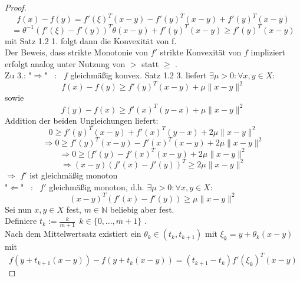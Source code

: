 \begin{proof}
		\begin{equation*}
		f(x)-f(y)=f'(\xi)^T(x-y)-f'(y)^T(x-y)+f'(y)^T(x-y)
		\end{equation*}
		\begin{equation*}
		=\theta^{-1}(f'(\xi)-f'(y))^T\theta(x-y)+f'(y)^T(x-y) \geq f'(y)^T(x-y)
		\end{equation*}
		mit Satz 1.2 1. folgt dann die Konvexität von f. \\
		Der Beweis, dass strikte Monotonie von $f'$ strikte Konvexität von $f$ impliziert erfolgt analog unter Nutzung von \(>\) statt  \( \geq \) . \\
		Zu 3.: 
		"$\Rightarrow$" \ : \ $f$ gleichmäßig konvex. Satz 1.2 3. liefert $\exists \mu > 0 : \forall x,y \in X:$
		\begin{equation*}
		f(x)-f(y) \geq f'(y)^T(x-y)+\mu \| x-y \|^2
		\end{equation*}
		sowie
		\begin{equation*}
		f(y)-f(x) \geq f'(x)^T(y-x)+ \mu \| x-y \|^2
		\end{equation*}
		Addition der beiden Ungleichungen liefert:
		\begin{equation*} \label{key}
		0 \geq f'(y)^T(x-y)+f'(x)^T(y-x)+2 \mu \| x-y \|^2
		\end{equation*}
		\begin{equation*}
		\Rightarrow 0 \geq f'(y)^T(x-y)-f'(x)^T(x-y)+2\mu \| x-y \|^2
		\end{equation*}
		\begin{equation*}
		\Rightarrow 0 \geq (f'(y)-f'(x)^T(x-y)+2\mu \| x-y \|^2
		\end{equation*}
		\begin{equation*}
		\Rightarrow (x-y)(f'(x)-f'(y))^T \geq 2\mu \| x-y \|^2
		\end{equation*}
		$\Rightarrow$ $f'$ ist gleichmäßig monoton\\
		"$\Leftarrow$" \ : \ $f'$ gleichmäßig monoton, d.h. $\exists \mu > 0 :\forall x,y \in X:$
		\begin{equation*}
		(x-y)^T(f'(x)-f'(y)) \geq \mu \| x-y\|^2 
		\end{equation*}
		Sei nun $x,y \in X$ fest, $m \in \mathbb{N}$ beliebig aber fest. \\
		Definiere $t_k:= \frac{k}{m+1} \  \ k \in \{0,...,m+1\}$ .\\
		Nach dem Mittelwertsatz existiert ein  $\theta_k \in (t_k,t_{k+1}) $ mit $ \xi_k=y+\theta_k(x-y) $ mit
		\begin{equation*}
		f(y+t_{k+1}(x-y))-f(y+t_k(x-y))=(t_{k+1}-t_k)f'(\xi_k)^T(x-y)

\end{equation*}
\end{proof}
